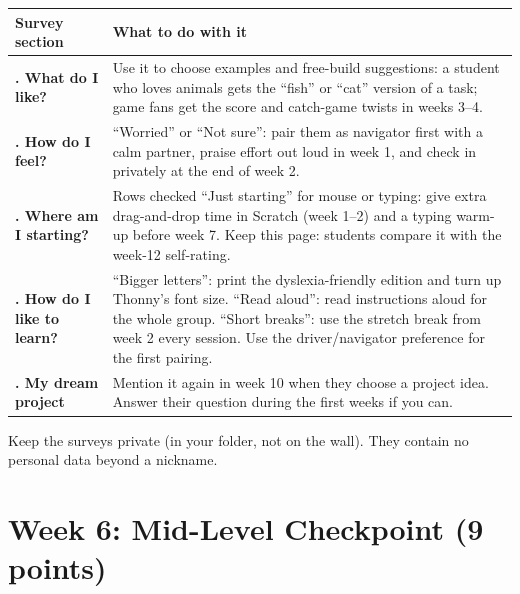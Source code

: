 \begin{center}\small\renewcommand{\arraystretch}{1.35}
\begin{tabularx}{\linewidth}{@{}>{\bfseries\RaggedRight}p{3.4cm}X@{}}
\toprule
Survey section & What to do with it\\
\midrule
1. What do I like? & Use it to choose examples and free-build suggestions: a student who loves animals gets the \enquote{fish} or \enquote{cat} version of a task; game fans get the score and catch-game twists in weeks 3--4.\\
2. How do I feel? & \enquote{Worried} or \enquote{Not sure}: pair them as navigator first with a calm partner, praise effort out loud in week 1, and check in privately at the end of week 2.\\
3. Where am I starting? & Rows checked \enquote{Just starting} for mouse or typing: give extra drag-and-drop time in Scratch (week 1--2) and a typing warm-up before week 7. Keep this page: students compare it with the week-12 self-rating.\\
4. How do I like to learn? & \enquote{Bigger letters}: print the dyslexia-friendly edition and turn up Thonny's font size. \enquote{Read aloud}: read instructions aloud for the whole group. \enquote{Short breaks}: use the stretch break from week 2 every session. Use the driver/navigator preference for the first pairing.\\
5. My dream project & Mention it again in week 10 when they choose a project idea. Answer their question during the first weeks if you can.\\
\bottomrule
\end{tabularx}
\end{center}
Keep the surveys private (in your folder, not on the wall). They contain no personal data beyond a nickname.

\section{Week 6: Mid-Level Checkpoint (9 points)}

